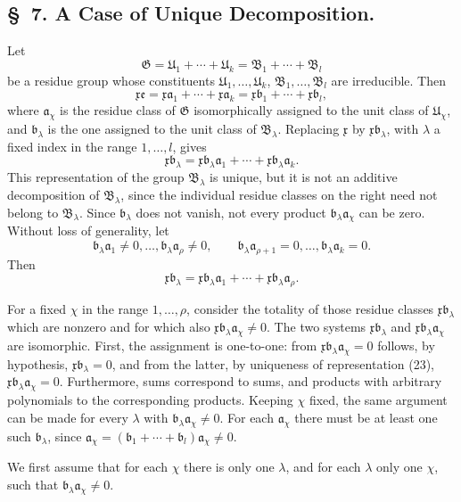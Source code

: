 \documentclass[11pt]{article}
\newcommand{\mG}{\mathfrak{G}}
\newcommand{\mB}{\mathfrak{B}}
\newcommand{\ma}{\mathfrak{a}}
\newcommand{\mb}{\mathfrak{b}}
\newcommand{\mx}{\mathfrak{x}}
\newcommand{\me}{\mathfrak{e}}
\providecommand{\mU}{\mathfrak{U}}
\begin{document}
\subsection*{\S~7. A Case of Unique Decomposition.}

Let
\[
 \mG=\mU_1+\cdots+\mU_k=\mB_1+\cdots+\mB_l
\]
be a residue group whose constituents $\mU_1,
\ldots,\mU_k$, $\mB_1,
\ldots,\mB_l$ are irreducible. Then
\begin{equation}
 \mx\me=\mx\ma_1+\cdots+\mx\ma_k
 =\mx\mb_1+\cdots+\mx\mb_l,
\tag{22}
\end{equation}
where $\ma_\chi$ is the residue class of $\mG$ isomorphically assigned to the unit class of $\mU_\chi$, and $\mb_\lambda$ is the one assigned to the unit class of $\mB_\lambda$. Replacing $\mx$ by $\mx\mb_\lambda$, with $\lambda$ a fixed index in the range $1,
\ldots,l$, gives
\begin{equation}
 \mx\mb_\lambda=\mx\mb_\lambda\ma_1+\cdots+\mx\mb_\lambda\ma_k.
\tag{23}
\end{equation}
This representation of the group $\mB_\lambda$ is unique, but it is not an additive decomposition of $\mB_\lambda$, since the individual residue classes on the right need not belong to $\mB_\lambda$. Since $\mb_\lambda$ does not vanish, not every product $\mb_\lambda\ma_\chi$ can be zero. Without loss of generality, let
\[
 \mb_\lambda\ma_1\ne0,
 \ldots,
 \mb_\lambda\ma_\rho\ne0,
 \qquad
 \mb_\lambda\ma_{\rho+1}=0,
 \ldots,
 \mb_\lambda\ma_k=0.
\]
Then
\[
 \mx\mb_\lambda=\mx\mb_\lambda\ma_1+\cdots+\mx\mb_\lambda\ma_\rho.
\]

For a fixed $\chi$ in the range $1,
\ldots,\rho$, consider the totality of those residue classes $\mx\mb_\lambda$ which are nonzero and for which also $\mx\mb_\lambda\ma_\chi\ne0$. The two systems $\mx\mb_\lambda$ and $\mx\mb_\lambda\ma_\chi$ are isomorphic. First, the assignment is one-to-one: from $\mx\mb_\lambda\ma_\chi=0$ follows, by hypothesis, $\mx\mb_\lambda=0$, and from the latter, by uniqueness of representation (23), $\mx\mb_\lambda\ma_\chi=0$. Furthermore, sums correspond to sums, and products with arbitrary polynomials to the corresponding products. Keeping $\chi$ fixed, the same argument can be made for every $\lambda$ with $\mb_\lambda\ma_\chi\ne0$. For each $\ma_\chi$ there must be at least one such $\mb_\lambda$, since $\ma_\chi=(\mb_1+
\cdots+\mb_l)\ma_\chi\ne0$.

We first assume that for each $\chi$ there is only one $\lambda$, and for each $\lambda$ only one $\chi$, such that $\mb_\lambda\ma_\chi\ne0$.
\end{document}
